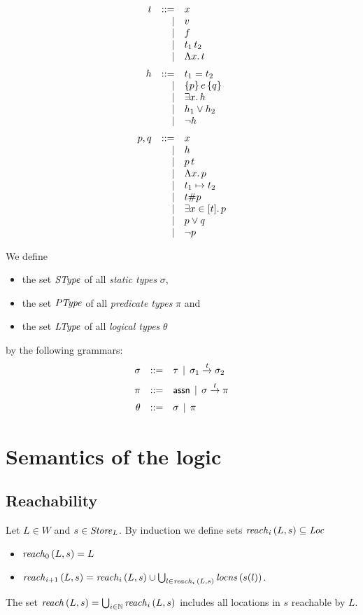 \documentclass[12pt,a4paper]{report}
\begin{document}
\[\GRbeg
  t \GRis x
    \GRal v
    \GRal f
    \GRal \app{t_1}{t_2}
    \GRal \tabstr{x}{t}
    \GRnl

  h \GRis t_1 = t_2
    \GRal \triple{p}{e}{q}
    \GRal \qex{x}{h}
    \GRal h_1 \vee h_2
    \GRal \neg h
    \GRnl

  p,q \GRis x
      \GRal h
      \GRal \app{p}{t}
      \GRal \tabstr{x}{p}
      \GRal t_1 \mapsto t_2
      \GRal t \# p
      \GRal \qbex{x}{t}{p}
      \GRal p \vee q
      \GRal \neg p
\GRend\]

We define 
\begin{itemize}
  \item the set $\mathit{SType}$ of all {\em static types} $\sigma$,
  \item the set $\mathit{PType}$ of all {\em predicate types} $\pi$ and
  \item the set $\mathit{LType}$ of all {\em logical types} $\theta$
\end{itemize}
by the following grammars:
\[\GRbeg
  \sigma \GRis \tau \GRmid \ttarrow{\sigma_1}{\sigma_2}
         \GRnl

  \pi \GRis \tassn \GRmid \ttarrow{\sigma}{\pi}
      \GRnl

  \theta \GRis \sigma \GRmid \pi
\GRend\]



\section{Semantics of the logic}



\subsection{Reachability}

\begin{definition}[Reachability]
  Let $L\in W$ and $s\in\mathit{Store}_L$. By induction we define sets $\mathit{reach}_{i}\,(L,s) \subseteq \mathit{Loc}$
  \begin{itemize}
    \item $\mathit{reach}_{0}\,(L,s) = L$
    \item $\mathit{reach}_{i+1}\,(L,s) = \mathit{reach}_{i}\,(L,s) \cup \bigcup_{l\in\mathit{reach}_{i}\,(L,s)} \mathit{locns}\,(s(l))$.
  \end{itemize}
  The set $\mathit{reach}\,(L,s) = \bigcup_{i\in\mathbb N} \mathit{reach}_{i}\,(L,s)$ includes all locations in $s$ reachable
  by $L$.
\end{definition}
\end{document}
